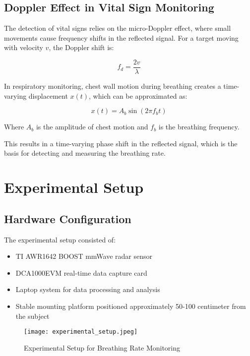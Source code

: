 \documentclass[12pt]{article}
\begin{document}
\subsection{Doppler Effect in Vital Sign Monitoring}
The detection of vital signs relies on the micro-Doppler effect, where small movements cause frequency shifts in the reflected signal. For a target moving with velocity $v$, the Doppler shift is:

\begin{equation}
f_d = \frac{2v}{\lambda}
\end{equation}

In respiratory monitoring, chest wall motion during breathing creates a time-varying displacement $x(t)$, which can be approximated as:

\begin{equation}
x(t) = A_b \sin(2\pi f_b t)
\end{equation}

Where $A_b$ is the amplitude of chest motion and $f_b$ is the breathing frequency.

This results in a time-varying phase shift in the reflected signal, which is the basis for detecting and measuring the breathing rate.

\section{Experimental Setup}

\subsection{Hardware Configuration}
The experimental setup consisted of:

\begin{itemize}
    \item TI AWR1642 BOOST mmWave radar sensor
    \item DCA1000EVM real-time data capture card
    \item Laptop system for data processing and analysis
    \item Stable mounting platform positioned approximately 50-100 centimeter from the subject
\end{itemize}

\begin{figure}[H]
\centering
\texttt{[image: experimental\_setup.jpeg]} %
\caption{Experimental Setup for Breathing Rate Monitoring}
\end{figure}
\end{document}
